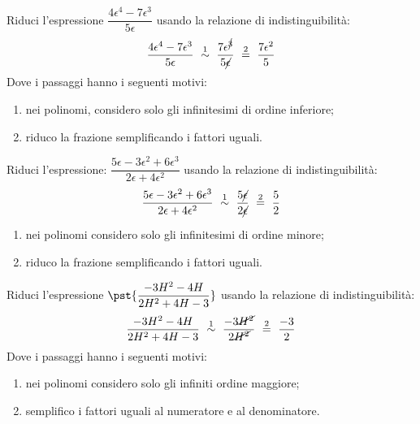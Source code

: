\begin{esempio}
Riduci l'espressione \quad 
\(\dfrac{4 \epsilon^4 -7 \epsilon^3}{5 \epsilon}\)
usando la relazione di indistinguibilità:
\[\dfrac{4 \epsilon^4 -7 \epsilon^3}{5 \epsilon} 
~ \stackrel{1}{\sim} ~
  \dfrac{7\epsilon^{\cancel{3}}}{5 \cancel{\epsilon}} 
~ \stackrel{2}{=} ~
  \dfrac{7\epsilon^2}{5}\]
Dove i passaggi hanno i seguenti motivi:
\begin{enumerate} [nosep]
 \item nei polinomi, considero solo gli infinitesimi di ordine inferiore; 
 \item riduco la frazione semplificando i fattori uguali.
\end{enumerate}
\end{esempio}

\begin{esempio}
Riduci l'espressione: \quad
\(\dfrac{5\epsilon -3 \epsilon^2 + 6 \epsilon^3}
         {2\epsilon + 4 \epsilon^2}\)
usando la relazione di indistinguibilità: 
\[\dfrac{5\epsilon -3 \epsilon^2 + 6 \epsilon^3}
         {2\epsilon + 4 \epsilon^2} 
~ \stackrel{1}{\sim} ~
  \dfrac{5 \cancel{\epsilon}}{2 \cancel{\epsilon}} 
~ \stackrel{2}{=} ~
  \dfrac{5}{2}\]
\begin{enumerate} [nosep]
 \item nei polinomi considero solo gli infinitesimi di ordine minore;
 \item riduco la frazione semplificando i fattori uguali.
\end{enumerate}
\end{esempio}

\begin{esempio}
Riduci l'espressione 
\(\pst{\dfrac{-3H^2 -4H}{2H^2 +4H -3}}\)
usando la relazione di indistinguibilità: 
\[\dfrac{-3H^2 -4H}{2H^2 +4H -3} 
~ \stackrel{1}{\sim} ~
  \dfrac{-3\cancel{H^2}}{2\cancel{H^2}} 
~ \stackrel{2}{=} ~
  \dfrac{-3}{2}\]
Dove i passaggi hanno i seguenti motivi:
\begin{enumerate} [nosep]
 \item nei polinomi considero solo gli infiniti ordine maggiore; 
 \item semplifico i fattori uguali al numeratore e al denominatore.
\end{enumerate}
\end{esempio}

